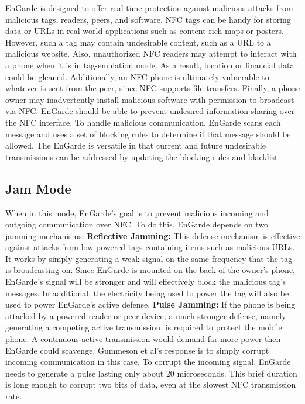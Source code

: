 \documentclass{sig-alternate}
\begin{document}
EnGarde is designed to offer real-time protection against malicious attacks from malicious tags, readers, peers, and software. NFC tags can be handy for storing data or URLs in real world applications such as content rich maps or posters. However, such a tag may contain undesirable content, such as a URL to a malicious website. Also, unauthorized NFC readers may attempt to interact with a phone when it is in tag-emulation mode. As a result, location or financial data could be gleaned. Additionally, an NFC phone is ultimately vulnerable to whatever is sent from the peer, since NFC supports file transfers. Finally, a phone owner may inadvertently install malicious software with permission to broadcast via NFC. EnGarde should be able to prevent undesired information sharing over the NFC interface.
\vspace{2mm}\newline
To handle malicious communication, EnGarde scans each message and uses a set of blocking rules to determine if that message should be allowed. The EnGarde is versatile in that current and future undesirable transmissions can be addressed by updating the blocking rules and blacklist.

\subsection{Jam Mode}
When in this mode, EnGarde's goal is to prevent malicious incoming and outgoing communication over NFC. To do this, EnGarde depends on two jamming mechanisms:
\vspace{2mm}\newline
\noindent\textbf{Reflective Jamming:} This defense mechanism is effective against attacks from low-powered tags containing items such as malicious URLs. It works by simply generating a weak signal on the same frequency that the tag is broadcasting on. Since EnGarde is mounted on the back of the owner's phone, EnGarde's signal will be stronger and will effectively block the malicious tag's messages. In additional, the electricity being used to power the tag will also be used to power EnGarde's active defense.
\vspace{2mm}\newline
\noindent\textbf{Pulse Jamming:} If the phone is being attacked by a powered reader or peer device, a much stronger defense, namely generating a competing active transmission, is required to protect the mobile phone. A continuous active transmission would demand far more power then EnGarde could scavenge. Gummeson et al's response is to simply corrupt incoming communication in this case. To corrupt the incoming signal, EnGarde needs to generate a pulse lasting only about 20 microseconds. This brief duration is long enough to corrupt two bits of data, even at the slowest NFC transmission rate.
\end{document}
